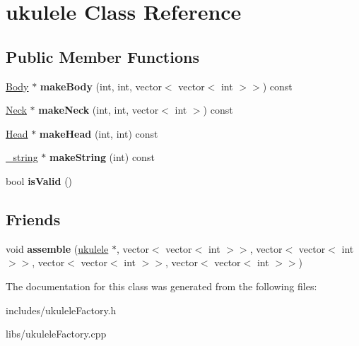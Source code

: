 \hypertarget{classukulele}{}\section{ukulele Class Reference}
\label{classukulele}
\subsection*{Public Member Functions}
\begin{DoxyCompactItemize}
\item 
\hypertarget{classukulele_a6b86e918773f8be9ec37e9d28ecf1410}{}\label{classukulele_a6b86e918773f8be9ec37e9d28ecf1410} 
\hyperlink{class_body}{Body} $\ast$ {\bfseries make\+Body} (int, int, vector$<$ vector$<$ int $>$$>$) const
\item 
\hypertarget{classukulele_a72f277f8dfd9c4af6140681b1755223d}{}\label{classukulele_a72f277f8dfd9c4af6140681b1755223d} 
\hyperlink{class_neck}{Neck} $\ast$ {\bfseries make\+Neck} (int, int, vector$<$ int $>$) const
\item 
\hypertarget{classukulele_a0bffda66d65c9f382826b20731e5794c}{}\label{classukulele_a0bffda66d65c9f382826b20731e5794c} 
\hyperlink{class_head}{Head} $\ast$ {\bfseries make\+Head} (int, int) const
\item 
\hypertarget{classukulele_adc1375800c8ca14551f68de9cd8f10dd}{}\label{classukulele_adc1375800c8ca14551f68de9cd8f10dd} 
\hyperlink{class__string}{\+\_\+string} $\ast$ {\bfseries make\+String} (int) const
\item 
\hypertarget{classukulele_abaebb7db2f23ebebb1775200cca5dac6}{}\label{classukulele_abaebb7db2f23ebebb1775200cca5dac6} 
bool {\bfseries is\+Valid} ()
\end{DoxyCompactItemize}
\subsection*{Friends}
\begin{DoxyCompactItemize}
\item 
\hypertarget{classukulele_a9361e21a6238ec9f3e3d50fc8b3880cc}{}\label{classukulele_a9361e21a6238ec9f3e3d50fc8b3880cc} 
void {\bfseries assemble} (\hyperlink{classukulele}{ukulele} $\ast$, vector$<$ vector$<$ int $>$$>$, vector$<$ vector$<$ int $>$$>$, vector$<$ vector$<$ int $>$$>$, vector$<$ vector$<$ int $>$$>$)
\end{DoxyCompactItemize}


The documentation for this class was generated from the following files\+:\begin{DoxyCompactItemize}
\item 
includes/ukulele\+Factory.\+h\item 
libs/ukulele\+Factory.\+cpp\end{DoxyCompactItemize}
